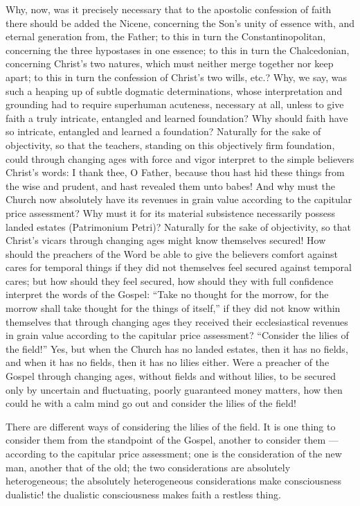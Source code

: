 \documentclass[12pt]{book}
\newcommand{\opage}[1]{\marginnote{\footnotesize\textit{[#1]}}}
\begin{document}
Why, now, was it precisely necessary that to the apostolic confession of faith
there should be added the Nicene, concerning the Son's unity of essence with,
and eternal generation from, the Father; to this in turn the
Constantinopolitan, concerning the three hypostases in one essence; to this in
turn the Chalcedonian, concerning Christ's two natures, which must neither
merge together nor keep apart; to this in turn the confession of Christ's two
wills, etc.? Why, we say, was such a heaping up of subtle dogmatic
determinations, whose interpretation and grounding had to require superhuman
acuteness, necessary at all, unless to give faith a truly intricate,
entangled and learned foundation? Why should faith have so intricate,
entangled and learned a foundation? Naturally for the sake of objectivity, so
that the teachers, standing on this objectively firm foundation, could through
changing ages with force and vigor interpret to the simple believers Christ's
words: I thank thee, O Father, because thou hast hid these things from the
wise and prudent, and hast revealed them unto babes! And why must the Church
now absolutely have its revenues in grain value according to the capitular
price assessment? Why must it
\opage{261}\setcounter{footnote}{0}%
for its material subsistence necessarily possess landed estates (Patrimonium
Petri)? Naturally for the sake of objectivity, so that Christ's vicars
through changing ages might know themselves secured! How should the preachers
of the Word be able to give the believers comfort against cares for temporal
things if they did not themselves feel secured against temporal cares; but how
should they feel secured, how should they with full confidence interpret the
words of the Gospel: ``Take no thought for the morrow, for the morrow shall
take thought for the things of itself,'' if they did not know within
themselves that through changing ages they received their ecclesiastical
revenues in grain value according to the capitular price assessment?
``Consider the lilies of the field!'' Yes, but when the Church has no landed
estates, then it has no fields, and when it has no fields, then it has no
lilies either. Were a preacher of the Gospel through changing ages, without
fields and without lilies, to be secured only by uncertain and fluctuating,
poorly guaranteed money matters, how then could he with a calm mind go out and
consider the lilies of the field!

There are different ways of considering the lilies of the field. It is one
thing to consider them from the standpoint of the Gospel, another to consider
them --- according to the capitular price assessment; one is the
consideration of the new man, another that of the old; the two considerations
are absolutely heterogeneous; the absolutely heterogeneous considerations make
consciousness dualistic! the dualistic consciousness makes faith a restless
thing.
\end{document}

